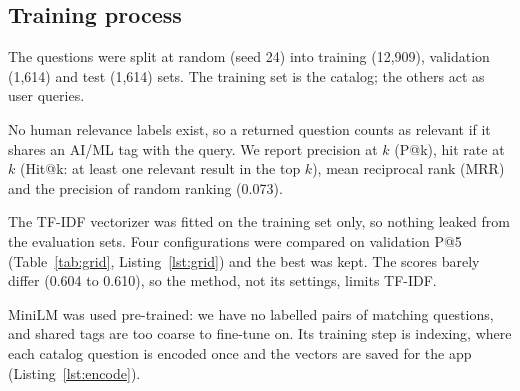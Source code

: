 \subsection{Training process}

The questions were split at random (seed 24) into training (12,909), validation (1,614) and test (1,614)
sets. The training set is the catalog; the others act as user queries.

No human relevance labels exist, so a returned question counts as relevant if it shares an AI/ML tag with
the query. We report precision at $k$ (P@k), hit rate at $k$ (Hit@k: at least one relevant result in the
top $k$), mean reciprocal rank (MRR) and the precision of random ranking (0.073).

The TF-IDF vectorizer was fitted on the training set only, so nothing leaked from the evaluation sets.
Four configurations were compared on validation P@5 (Table~\ref{tab:grid}, Listing~\ref{lst:grid}) and the best was kept. The
scores barely differ (0.604 to 0.610), so the method, not its settings, limits TF-IDF.




MiniLM was used pre-trained: we have no labelled pairs of matching questions, and shared tags are too
coarse to fine-tune on. Its training step is indexing, where each catalog question is encoded once and
the vectors are saved for the app (Listing~\ref{lst:encode}).

